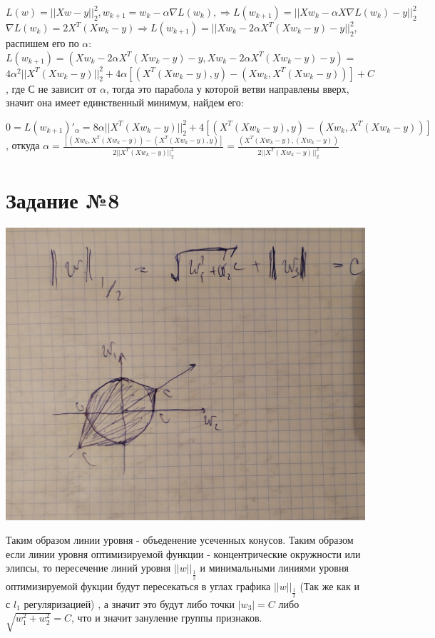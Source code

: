 \documentclass[12pt,a4paper,oneside]{scrartcl}
\begin{document}
$ L(w) = ||Xw - y||_2^2, w_{k+1} = w_k - \alpha \nabla L(w_k), \Rightarrow L(w_{k+1}) = ||Xw_k - \alpha X \nabla L(w_k) - y||_2^2$ \\
$ \nabla L(w_k) = 2X^T(Xw_k - y) \Rightarrow L(w_{k+1}) = ||Xw_k - 2\alpha X^T(Xw_k - y) - y||_2^2 $, распишем его по $\alpha$: \\
$L(w_{k+1}) =  (Xw_k - 2\alpha X^T(Xw_k - y) - y , Xw_k - 2\alpha X^T(Xw_k - y) - y) =$ \\
$4\alpha^2 ||X^T(Xw_k - y)||_2^2 + 4\alpha [(X^T(Xw_k - y), y) - (Xw_k,X^T(Xw_k - y)) ] + C$, где С не зависит от $\alpha$, тогда это парабола у которой ветви направлены вверх, значит она имеет единственный минимум, найдем его:

$0 = L(w_{k+1})'_{\alpha} = 8\alpha ||X^T(Xw_k - y)||_2^2 + 4 [(X^T(Xw_k - y), y) - (Xw_k,X^T(Xw_k - y)) ]$, откуда $ \alpha = \frac{[(Xw_k,X^T(Xw_k - y)) - (X^T(Xw_k - y), y)]}{2 ||X^T(Xw_k - y)||_2^2} = \frac{(X^T(Xw_k - y),(Xw_k - y))}{2 ||X^T(Xw_k - y)||_2^2} $

\section{Задание №8}
\includegraphics[scale=0.4]{Hw_pict.jpg}

Таким образом линии уровня - объеденение усеченных конусов. Таким образом если линии уровня оптимизируемой функции - концентрические окружности или элипсы, то пересечение линий уровня $||w||_{\frac{1}{2}}$ и минимальными линиями уровня оптимизируемой фукции будут пересекаться в углах графика $||w||_{\frac{1}{2}}$ (Так же как и с $l_1$ регуляризацией) , а значит это будут либо точки $|w_3| = C$ либо $\sqrt{w_1^2 + w_2^2} = C$, что и значит зануление группы признаков.
\end{document}

